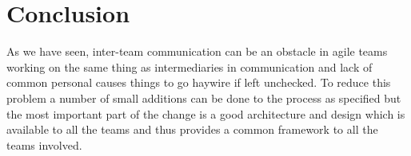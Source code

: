 \section{Conclusion} 
\label{sec:conclusion}
As we have seen, inter-team communication can be an obstacle in agile teams working on the same thing as intermediaries in communication and lack of common personal causes things to go haywire if left unchecked.
To reduce this problem a number of small additions can be done to the process as specified but the most important part of the change is a good architecture and design which is available to all the teams and thus provides a common framework to all the teams involved.